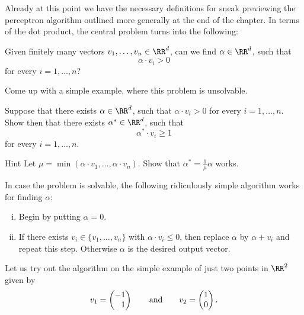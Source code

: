 \documentclass{article}
\newcommand{\vect}[2]{\begin{pmatrix} #1 \\ #2 \end{pmatrix}}
\newcommand{\hphm}{\hphantom{-}}
\begin{document}
\begin{example}\label{exampleperceptronsimple}

Already at this point we have the necessary definitions for sneak previewing the
perceptron algorithm outlined more generally at the end of the chapter.
In terms of the dot product, the central problem turns into the following:

  Given finitely many vectors $v_1, \dots, v_n\in \RR^d$, can we find
  $\alpha\in \RR^d$, such that
  $$
  \alpha\cdot v_i > 0
  $$
  for every $i = 1, \dots, n$?

  
\beginshex
Come up with a simple example, where this problem is unsolvable.
\endshex

\beginshex
Suppose that there exists $\alpha\in \RR^d$, such that
$\alpha\cdot v_i > 0$ for every $i = 1, \dots, n$. Show then that
there exists $\alpha^*\in \RR^d$, such that
$$
\alpha^* \cdot v_i \geq 1
$$
for every $i = 1, \dots, n$.

\begin{hideinbutton}{Hint}
  Let $\mu = \min(\alpha\cdot v_1, \dots, \alpha\cdot v_n)$. Show that
  $\alpha^* = \frac{1}{\mu} \alpha$ works.
\end{hideinbutton}
\endshex

In case the problem is solvable, the following
ridiculously simple algorithm works for finding $\alpha$:

\begin{frameit}
  \begin{enumerate}[(i)]
  \item Begin by putting $\alpha = 0$.
  \item If there exists $v_i\in \{v_1, \dots, v_n\}$ with $\alpha\cdot v_i \leq 0$, then replace
    $\alpha$ by $\alpha + v_i$ and repeat this step. Otherwise $\alpha$ is the desired output vector.
  \end{enumerate}
    
\end{frameit}



Let us try out the algorithm on the simple example of just
two points in $\RR^2$ given by
$$
v_1 = \vect{-1}{\hphm 1}\qquad\text{and}\qquad v_2 =
\vect{1}{0}.
$$


\end{example}
\end{document}
